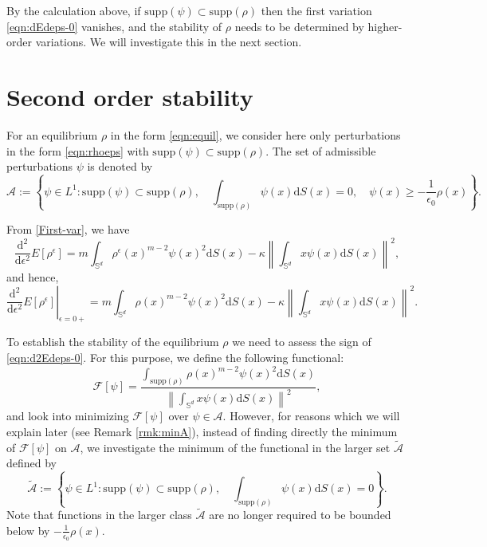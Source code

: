 \documentclass[11pt]{amsart}
\newcommand{\bbs}{\mathbb S}
\def\d{\mathrm{d}}
\newcommand{\dx}{\mathrm{d}S (x)}
\newcommand{\supp}{\mathrm{supp}(\rho)}
\newcommand{\dm}{d} %
\begin{document}
By the calculation above, if $\mathrm{supp}(\psi)\subset\supp$ then the first variation \eqref{eqn:dEdeps-0} vanishes, and the stability of $\rho$ needs to be determined by higher-order variations. We will investigate this in the next section.

\section{Second order stability}
\label{sect:2nd-order}
For an equilibrium $\rho$ in the form \eqref{eqn:equil}, we consider here only perturbations in the form \eqref{eqn:rhoeps} with  
$\mathrm{supp}(\psi)\subset \mathrm{supp}(\rho)$.
The set of admissible perturbations $\psi$ is denoted by
\begin{equation}
\label{eqn:calA}
\mathcal{A}:=\left\{\psi \in L^1:\mathrm{supp}(\psi)\subset \supp,\quad\int_{\supp}\psi(x)\dx=0,\quad \psi(x)\geq-\frac{1}{\epsilon_0}\rho(x)\right\}.
\end{equation}

From \eqref{First-var}, we have
\begin{equation*}
\frac{\d^2}{\d\epsilon^2}E[\rho^\epsilon]=m\int_{\bbs^\dm}\rho^\epsilon(x)^{m-2}\psi(x)^2\dx-\kappa \left \| \int_{\bbs^\dm} x \psi(x) \dx \right \|^2,
\end{equation*}
and hence,
\begin{equation}
\label{eqn:d2Edeps-0}
\left.\frac{\d^2}{\d\epsilon^2}E[\rho^\epsilon]\right|_{\epsilon=0+}=m\int_{\bbs^\dm}\rho(x)^{m-2}\psi(x)^2\dx-\kappa \left \| \int_{\bbs^\dm} x \psi(x) \dx \right \|^2.
\end{equation}

To establish the stability of the equilibrium $\rho$ we need to assess the sign of \eqref{eqn:d2Edeps-0}. For this purpose, we define the following functional:
\begin{equation}
\label{eqn:calF}
\mathcal{F}[\psi]=\frac{\int_{\supp}\rho(x)^{m-2}\psi(x)^2\dx}{\left \| \int_{\bbs^\dm} x \psi(x) \dx \right \|^2},
\end{equation}
and look into minimizing $\mathcal{F}[\psi]$ over $\psi \in \mathcal{A}$. However, for reasons which we will explain later (see Remark \ref{rmk:minA}), instead of finding directly the minimum of $\mathcal{F}[\psi]$ on $\mathcal{A}$, we investigate the minimum of the functional in the larger set $\tilde{\mathcal{A}}$ defined by
\begin{equation}
\label{eqn:calAtilde}
\tilde{\mathcal{A}}:=\left\{\psi \in L^1:\mathrm{supp}(\psi)\subset \supp,\quad\int_{\supp}\psi(x)\dx=0\right\}.
\end{equation}
Note that functions in the larger class $\tilde{\mathcal{A}}$ are no longer required to be bounded below by $-\frac{1}{\epsilon_0}\rho(x)$.
\end{document}
